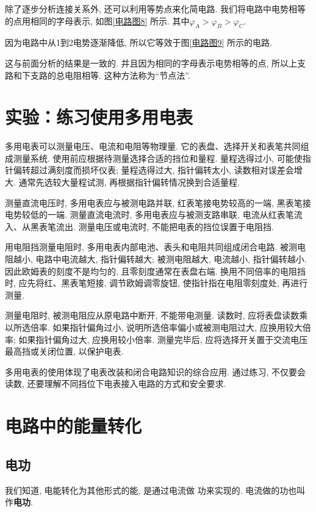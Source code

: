 \documentclass[11pt,a4paper]{ctexbook}
\begin{document}
除了逐步分析连接关系外, 还可以利用等势点来化简电路.
我们将电路中电势相等的点用相同的字母表示, 如图\ref{电路图8} 所示.
其中$\varphi_A>\varphi_B>\varphi_C$.

因为电路中从1到2电势逐渐降低, 所以它等效于图\ref{电路图9} 所示的电路.

这与前面分析的结果是一致的. 并且因为相同的字母表示电势相等的点,
所以上支路和下支路的总电阻相等.
这种方法称为``节点法''.


\section{实验：练习使用多用电表}

多用电表可以测量电压、电流和电阻等物理量. 它的表盘、选择开关和表笔共同组成测量系统.
使用前应根据待测量选择合适的挡位和量程. 量程选得过小, 可能使指针偏转超过满刻度而损坏仪表;
量程选得过大, 指针偏转太小, 读数相对误差会增大. 通常先选较大量程试测, 再根据指针偏转情况换到合适量程.

测量直流电压时, 多用电表应与被测电路并联, 红表笔接电势较高的一端, 黑表笔接电势较低的一端.
测量直流电流时, 多用电表应与被测支路串联, 电流从红表笔流入、从黑表笔流出. 测量电压或电流时,
不能把电表的挡位误置于电阻挡.

用电阻挡测量电阻时, 多用电表内部电池、表头和电阻共同组成闭合电路. 被测电阻越小, 电路中电流越大,
指针偏转越大; 被测电阻越大, 电流越小, 指针偏转越小. 因此欧姆表的刻度不是均匀的, 且零刻度通常在表盘右端.
换用不同倍率的电阻挡时, 应先将红、黑表笔短接, 调节欧姆调零旋钮, 使指针指在电阻零刻度处, 再进行测量.

测量电阻时, 被测电阻应从原电路中断开, 不能带电测量. 读数时, 应将表盘读数乘以所选倍率.
如果指针偏角过小, 说明所选倍率偏小或被测电阻过大, 应换用较大倍率; 如果指针偏角过大,
应换用较小倍率. 测量完毕后, 应将选择开关置于交流电压最高挡或关闭位置, 以保护电表.

多用电表的使用体现了电表改装和闭合电路知识的综合应用. 通过练习, 不仅要会读数,
还要理解不同挡位下电表接入电路的方式和安全要求.

\section{电路中的能量转化}

\subsection{电功}

我们知道, 电能转化为其他形式的能, 是通过电流做
功来实现的. 电流做的功也叫作\textbf{电功}.
\end{document}
